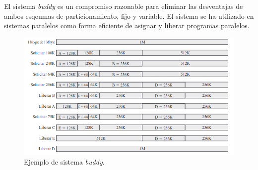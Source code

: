 \documentclass[12pt, a4paper]{article}
\begin{document}
El sistema \textit{buddy} es un compromiso razonable para eliminar las desventajas de ambos esqeumas de particionamiento, fijo y variable. El sistema se ha utilizado en sistemas paralelos como forma eficiente de asignar y liberar programas paralelos.
\begin{figure}[H]
    \centering
    \includegraphics[width=15cm]{buddy.png}\par
    \caption{Ejemplo de sistema \textit{buddy}.}
\end{figure}
\end{document}
